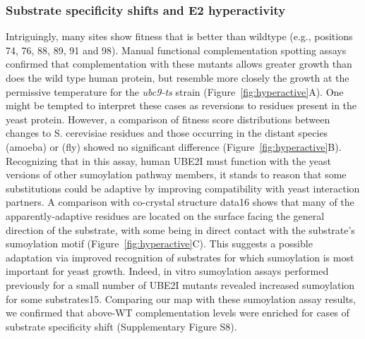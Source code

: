 \subsubsection{Substrate specificity shifts and E2 hyperactivity}

Intriguingly, many sites show fitness that is better than wildtype (e.g., positions 74, 76, 88, 89, 91 and 98). Manual functional complementation spotting assays confirmed that complementation with these mutants allows greater growth than does the wild type human protein, but resemble more closely the growth at the permissive temperature for the \textit{ubc9-ts} strain (Figure~\ref{fig:hyperactive}A). One might be tempted to interpret these cases as reversions to residues present in the yeast protein. However, a comparison of fitness score distributions between changes to S. cerevisiae  residues and those occurring in the distant species  (amoeba) or  (fly) showed no significant difference (Figure~\ref{fig:hyperactive}B). Recognizing that in this assay, human UBE2I must function with the yeast versions of other sumoylation pathway members, it stands to reason that some substitutions could be adaptive by improving compatibility with yeast interaction partners. A comparison with co-crystal structure data16 shows that many of the apparently-adaptive residues are located on the surface facing the general direction of the substrate, with some being in direct contact with the substrate’s sumoylation motif (Figure~\ref{fig:hyperactive}C). This suggests a possible adaptation via improved recognition of substrates for which sumoylation is most important for yeast growth. Indeed, in vitro sumoylation assays performed previously for a small number of UBE2I mutants revealed increased sumoylation for some substrates15. Comparing our map with these sumoylation assay results, we confirmed that above-WT complementation levels were enriched for cases of substrate specificity shift (Supplementary Figure S8).


